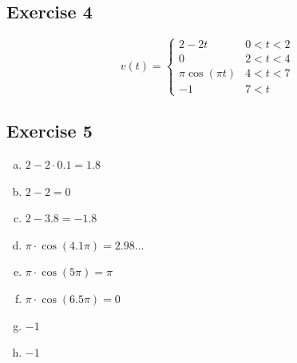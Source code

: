 \documentclass[11pt]{article}
\begin{document}
\subsection{Exercise 4}

\begin{equation*}
	v(t) =
	\begin{cases}
		2-2t & 0 < t < 2 \\
		0 & 2 < t < 4 \\
		\pi \cos(\pi t) & 4 < t < 7 \\
		-1 & 7 < t
	\end{cases}
\end{equation*}

\subsection{Exercise 5}

\begin{enumerate}[a.]
	\item $2-2 \cdot{} 0.1 = 1.8$
	\item $2-2 = 0$
	\item $2-3.8 = -1.8$
	\item $\pi \cdot \cos(4.1\pi) = 2.98 \dots $
	\item $\pi \cdot \cos(5\pi) = \pi$
	\item $\pi \cdot \cos(6.5\pi) = 0$
	\item $-1$
	\item $-1$
\end{enumerate}
\end{document}
